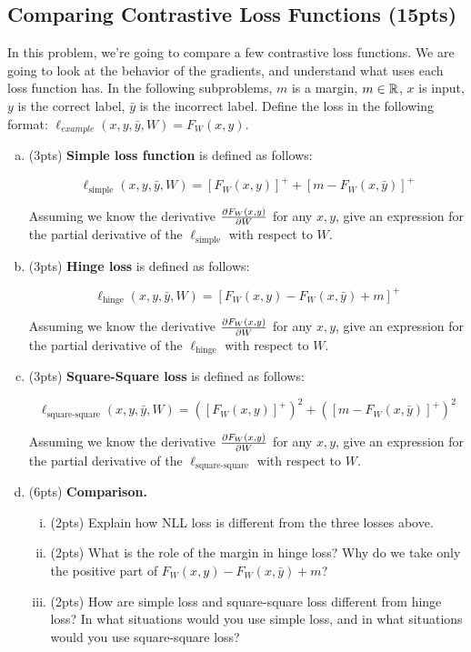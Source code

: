 \subsection{Comparing Contrastive Loss Functions (15pts)}

In this problem, we're going to compare a few contrastive loss functions. We are going to look at the behavior of the gradients, and understand what uses each loss function has. In the following subproblems, $m$ is a margin, $m \in \mathbb{R}$, $x$ is input, $y$ is the correct label, $\bar y$ is the incorrect label. Define the loss in the following format: $\ell_{example}(x, y, \bar y, W) = F_W(x, y)$.

\begin{enumerate}[(a)]
\item (3pts) \textbf{Simple loss function} is defined as follows:

$$
\ell_\text{simple}(x, y, \bar y, W) = \left[ F_W(x, y)\right]^+ + \left[m - F_W(x, \bar y)\right]^+
$$

Assuming we know the derivative $\frac{\partial F_W(x, y)}{\partial W}$ for any $x, y$, give an expression for the partial derivative of the $\ell_\text{simple}$ with respect to $W$.

\item (3pts) \textbf{Hinge loss} is defined as follows:

$$
\ell_\text{hinge}(x, y, \bar y, W) = \left[ F_W(x, y) - F_W(x, \bar y) + m\right ]^+
$$

Assuming we know the derivative $\frac{\partial F_W(x, y)}{\partial W}$ for any $x, y$, give an expression for the partial derivative of the $\ell_\text{hinge}$ with respect to $W$.

\item (3pts) \textbf{Square-Square loss} is defined as follows:

$$
\ell_\text{square-square}(x, y, \bar y, W) = \left(\left[ F_W(x, y)\right]^+ \right)^2 + \left( \left[m - F_W(x, \bar y)\right]^+ \right)^2
$$

Assuming we know the derivative $\frac{\partial F_W(x, y)}{\partial W}$ for any $x, y$, give an expression for the partial derivative of the $\ell_\text{square-square}$ with respect to $W$.

\item (6pts) \textbf{Comparison.} 
\begin{enumerate}[(i)]
    \item (2pts) Explain how NLL loss is different from the three losses above.
    \item (2pts) What is the role of the margin in hinge loss? Why do we take only the positive part of $ F_W(x, y) - F_W(x, \bar y) + m$?
    \item (2pts) How are simple loss and square-square loss different from hinge loss? In what situations would you use simple loss, and in what situations would you use square-square loss?
\end{enumerate}

\end{enumerate}